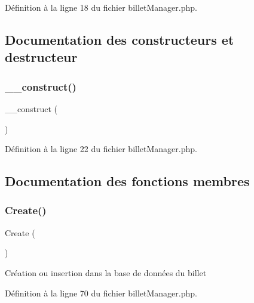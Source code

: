 Définition à la ligne 18 du fichier billet\+Manager.\+php.



\subsection{Documentation des constructeurs et destructeur}
\mbox{\label{class_src_1_1_managers_1_1billet_manager_a095c5d389db211932136b53f25f39685}} 
\subsubsection{\texorpdfstring{\+\_\+\+\_\+construct()}{\_\_construct()}}
{\footnotesize\ttfamily \+\_\+\+\_\+construct (\begin{DoxyParamCaption}{ }\end{DoxyParamCaption})}



Définition à la ligne 22 du fichier billet\+Manager.\+php.



\subsection{Documentation des fonctions membres}
\mbox{\label{class_src_1_1_managers_1_1billet_manager_ad01f71fa0ecc039494e3c282864298c3}} 
\subsubsection{\texorpdfstring{Create()}{Create()}}
{\footnotesize\ttfamily Create (\begin{DoxyParamCaption}{ }\end{DoxyParamCaption})}

Création ou insertion dans la base de données du billet 

Définition à la ligne 70 du fichier billet\+Manager.\+php.

